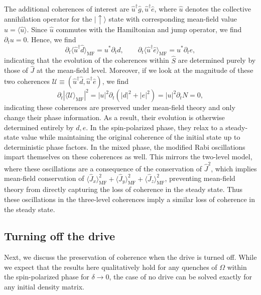 The additional coherences of interest are $\hat u^\dagger \hat g, \hat u^\dagger \hat e$, where $\hat u$ denotes the collective annihilation operator for the $|{\uparrow}\rangle$ state with corresponding mean-field value $u = \langle \hat u \rangle$. Since $\hat u$ commutes with the Hamiltonian and jump operator, we find $\partial_t u = 0$. Hence, we find
\begin{equation}
    \partial_t \langle \hat u^\dagger \hat d \rangle_{\text{MF}} = u^* \partial_t d, \qquad \partial_t \langle \hat u^\dagger \hat e \rangle_{\text{MF}} =  u^* \partial_t e,
\end{equation}
indicating that the evolution of the coherences within $\hat S$ are determined purely by those of $\hat J$ at the mean-field level. Moreover, if we look at the magnitude of these two coherences $\mathcal{U} \equiv (\hat u^\dagger \hat d, \hat u^\dagger \hat e)$, we find
\begin{equation}
    \partial_t |\langle \mathcal{U} \rangle_{\text{MF}} |^2 = |u|^2 \partial_t (|d|^2+|e|^2) = |u|^2 \partial_t N = 0,
\end{equation}
indicating these coherences are preserved under mean-field theory and only change their phase information. As a result, their evolution is otherwise determined entirely by $d, e$. In the spin-polarized phase, they relax to a steady-state value while maintaining the original coherence of the initial state up to deterministic phase factors. In the mixed phase, the modified Rabi oscillations impart themselves on these coherences as well. This mirrors the two-level model, where these oscillations are a consequence of the conservation of $\hat J^2$, which implies mean-field conservation of $\langle \hat J_x \rangle_{\text{MF}}^2 + \langle \hat J_y \rangle_{\text{MF}}^2 + \langle \hat J_z \rangle_{\text{MF}}^2$, preventing mean-field theory from directly capturing the loss of coherence in the steady state. Thus these oscillations in the three-level coherences imply a similar loss of coherence in the steady state.

\subsection{Turning off the drive}

Next, we discuss the preservation of coherence when the drive is turned off. While we expect that the results here qualitatively hold for any quenches of $\Omega$ within the spin-polarized phase for $\delta \to 0$, the case of no drive can be solved exactly for any initial density matrix. 

